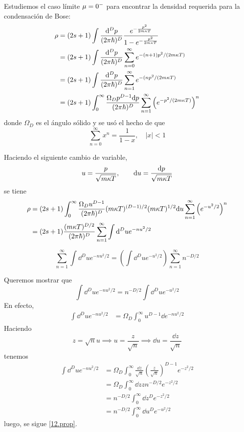 Estudiemos el caso límite $\mu =0^{-}$ para encontrar la densidad requerida para la condensación de Bose:
\begin{align}
  \rho&=(2s+1)\int \frac{\dd^Dp}{(2\pi \hbar)^D}\frac{e^{-\frac{p^2}{2m\kappa T}}}{1-e^{-\frac{p^2}{2m\kappa T}}}\\
  &=   (2s+1)\int \frac{\dd^Dp}{(2\pi \hbar)^D}\sum_{n=0}^\infty e^{-(n+1)p^2/(2m\kappa T)}      \\
  &=   (2s+1)\int \frac{\dd^Dp}{(2\pi \hbar)^D}\sum_{n=1}^\infty e^{-(np^2/(2m\kappa T)}  \\
  &=(2s+1)\int_0^\infty \frac{\Omega_D p^{D-1}\dd p}{(2\pi\hbar)^D}\sum_{n=1}^\infty \left(e^{-p^2/(2m\kappa T)}\right)^n
\end{align}
donde $\Omega_D$ es el ángulo sólido y se usó el hecho de que
\begin{equation}
  \sum_{n=0}^\infty x^n=\frac{1}{1-x},\quad |x|<1
\end{equation}

 Haciendo el siguiente cambio de variable,
\begin{equation}
  u=\frac{p}{\sqrt{m\kappa T}},\qquad \dd u=\frac{\dd p}{\sqrt{m\kappa T}}
\end{equation}
se tiene
\begin{align}
  \rho&=(2s+1) \int_0^\infty\frac{\Omega_Du^{D-1}}{(2\pi\hbar)^D}(m\kappa T)^{(D-1)/2}(m\kappa T)^{1/2}\dd u\sum_{n=1}^\infty \left(e^{-u^2/2}\right)^n\\
  &=(2s+1)\frac{(m\kappa T)^{D/2}}{(2\pi\hbar)^D}\sum_{n=1}^\infty \int\dd^D ue^{-nu^2/2}
\end{align}

\begin{prop}
	\begin{equation}\label{12.prop}
  \sum_{n=1}^\infty \int\dd^D ue^{-nu^2/2}=\left(\int \dd^D ue^{-u^2/2}\right)\sum_{n=1}^\infty n^{-D/2}
\end{equation}
\end{prop}
\begin{prueba}
	Queremos mostrar que 
	\begin{equation}
  \int\dd^Due^{-nu^2/2}=n^{-D/2}\int\dd^Due^{-u^2/2}
\end{equation}
En efecto,
\begin{align}
  \int\dd^Due^{-nu^2/2}&=\Omega_D\int_0^\infty u^{D-1}\dd e^{-nu^2/2}
\end{align}
Haciendo
\begin{equation}
  z=\sqrt{n}u\implies u=\frac{z}{\sqrt{n}}\implies	 \dd u=\frac{\dd z}{\sqrt{n}}
\end{equation}
tenemos
\begin{align}
  \int\dd^Due^{-nu^2/2}&=\Omega_D\int_0^\infty \frac{\dd z}{\sqrt{n}}\left(\frac{z}{\sqrt{n}}\right)^{D-1}e^{-z^2/2}\\
  &=\Omega_D\int_0^\infty \dd z zn^{-D/2}e^{-z^2/2}\\
  &=n^{-D/2}\int_0^\infty \dd z^De^{-z^2/2}\\
  &=n^{-D/2}\int_0^\infty \dd u^De^{-u^2/2}
\end{align}
luego, se sigue \eqref{12.prop}.
\end{prueba}


